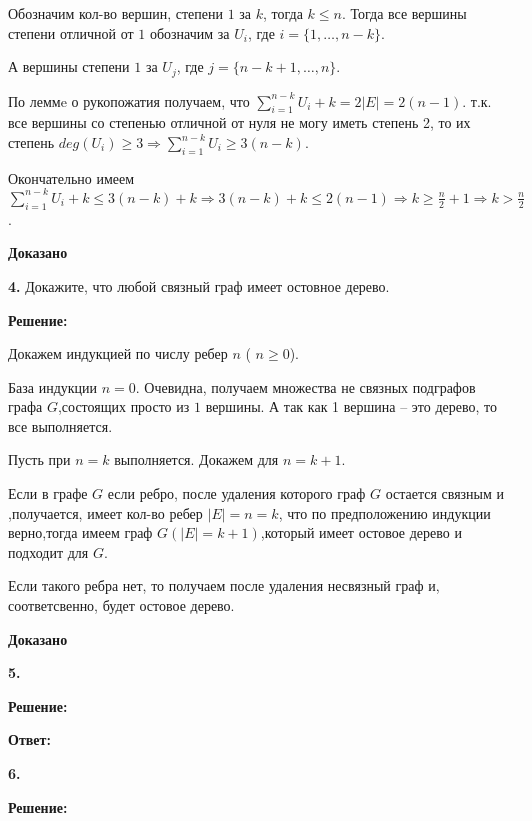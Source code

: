 \documentclass[a4paper,12pt]{article} %
\begin{document}
Обозначим кол-во вершин, степени $1$ за $k$, тогда $k \leqslant n$.
Тогда все вершины степени отличной от $1$ обозначим за $U_i$, где $i = \{ 1,\dots , n - k\} $. 

А вершины степени $1$ за $U_j$, где $j = \{ n-k+1,\dots , n\} $.

По леммe о рукопожатия получаем, что $ \sum\limits_{i = 1}^{n-k}U_i + k = 2|E| = 2(n-1)$. т.к. все вершины со степенью отличной от нуля не могу иметь степень 2, то их степень $deg(U_i) \geqslant 3 \Rightarrow \sum\limits_{i = 1}^{n-k}U_i \geqslant 3(n-k)$.

Окончательно имеем $ \sum\limits_{i = 1}^{n-k}U_i + k  \leqslant 3(n-k) + k \Rightarrow 3(n-k) + k \leqslant 2(n-1) \Rightarrow k \geqslant \frac{n}{2}+1 \Rightarrow k > \frac{n}{2}$.

\begin{flushright}
\begin{large}
\textbf {Доказано}
\end{large}
\end{flushright}
\newpage
{\bf 4. }Докажите, что любой связный граф имеет остовное дерево. 
\begin{center}
\bfseries
{\Large Решение: }
\end{center}

Докажем индукцией по числу ребер $n$ ( $n \geqslant 0$).

База индукции $n = 0$. Очевидна, получаем множества не связных подграфов графа $G$,состоящих просто из $1$ вершины. А так как 1 вершина -- это дерево, то все выполняется.

Пусть при $n=k$ выполняется. Докажем для $n = k + 1$.

Если в графе $G$ если ребро, после удаления которого граф $G$ остается связным и ,получается, имеет кол-во ребер $|E| = n = k$, что по предположению индукции верно,тогда имеем граф $G(|E| = k+1)$,который имеет остовое дерево и подходит для $G$.

Если такого ребра нет, то получаем после удаления несвязный граф и, соответсвенно, будет остовое дерево.


\begin{flushright}
\begin{large}
\textbf {Доказано}
\end{large}
\end{flushright}
{\bf 5.} 
\begin{center}
\bfseries
{\Large Решение: }
\end{center}

\begin{flushright}
\begin{large}
\textbf {Ответ: }
\end{large}
\end{flushright}
{\bf 6.} 
\begin{center}
\bfseries
{\Large Решение: }
\end{center}
\end{document}
